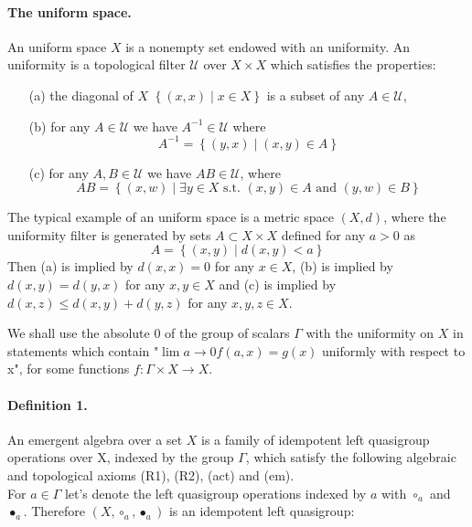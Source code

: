\documentclass{article}
\begin{document}
\paragraph{The uniform space.} An uniform space $X$ is a nonempty set endowed with an uniformity. An uniformity is a topological filter $\mathcal{U}$ over $X \times X$ which satisfies the properties: 
\begin{enumerate}
  \item[(a)] the diagonal of $X$ $\displaystyle \left\{ (x,x) \mid x \in X \right\}$  is a subset of any $A \in \mathcal{U}$, 
  \item[(b)] for any $A \in \mathcal{U}$ we have $\displaystyle A^{-1} \in \mathcal{U}$ where $$\displaystyle A^{-1} = \left\{  (y,x) \mid (x,y) \in A \right\}$$
  \item[(c)] for any $A,B \in \mathcal{U}$ we have $AB \in \mathcal{U}$, where  $$\displaystyle AB = \left\{ (x,w) \mid \exists y \in X \mbox{ s.t. } (x,y) \in A \mbox{ and } (y,w) \in B \right\}$$
\end{enumerate}

The typical example of an uniform space is a metric space $(X,d)$, where the uniformity filter is generated by sets $A \subset X \times X$ defined for any $a > 0$ as
$$A = \left\{ (x,y) \mid d(x,y) < a \right\}$$
Then (a) is implied by $d(x,x) = 0$ for any $x \in X$, (b) is implied by $d(x,y) = d(y,x)$ for any $x,y \in X$ and (c) is implied by $d(x,z) \leq d(x,y) + d(y,z)$ for any $x,y,z \in X$. 

We shall use the absolute $0$ of the group of scalars $\Gamma$ with the uniformity on $X$ in statements which contain "$\lim{a \rightarrow 0} f(a,x) = g(x)$ uniformly with respect to x", for some functions $\displaystyle f: \Gamma \times X \rightarrow X$. 


\paragraph{Definition 1.} 
An emergent algebra over a set $X$ is a family of idempotent left quasigroup operations over X, 
indexed by the group $\Gamma$, which satisfy the following algebraic and topological axioms (R1), (R2), (act) and (em). \\


For $\displaystyle a \in \Gamma$ let's denote the left quasigroup operations indexed by $a$ with $\displaystyle \circ_a$ and $\displaystyle \bullet_a$. Therefore 
$\displaystyle (X,\circ_a ,\bullet_a )$ is an idempotent left quasigroup: \\
\end{document}
